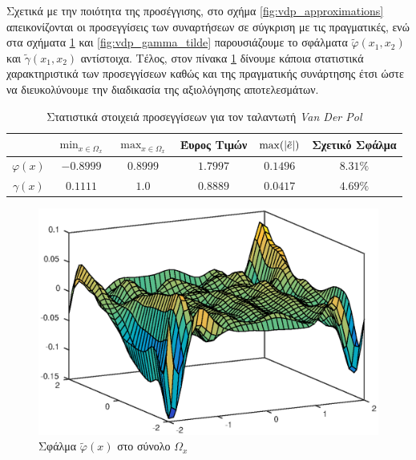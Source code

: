 {Σχετικά με την ποιότητα της προσέγγισης, στο σχήμα \ref{fig:vdp_approximations} απεικονίζονται οι προσεγγίσεις των συναρτήσεων σε σύγκριση με τις πραγματικές, ενώ στα σχήματα \ref{fig:vdp_phi_tilde} και \ref{fig:vdp_gamma_tilde} παρουσιάζουμε το σφάλματα $\tilde{\varphi}(x_1,x_2)$ και $\tilde{\gamma}(x_1,x_2)$ αντίστοιχα. Τέλος, στον πίνακα \ref{tab:statistics_vdp} δίνουμε κάποια στατιστικά χαρακτηριστικά των προσεγγίσεων καθώς και της πραγματικής συνάρτησης έτσι ώστε να διευκολύνουμε την διαδικασία της αξιολόγησης αποτελεσμάτων.

}

\begin{table}
	\centering
	\begin{tabular}{  c | c | c | c | c | c }
		& $\min_{x \in \Omega_x}$ & $\max_{x \in \Omega_x}$ & Έυρος Τιμών & $\max(\abs{\tilde{e}})$ & Σχετικό Σφάλμα  \\ \hline \hline
		$\varphi(x)$ & $-0.8999$ & $0.8999$ & $1.7997$ & $0.1496$ & $8.31\%$ \\
		$\gamma(x)$  & $ 0.1111$ & $ 1.0$   & $0.8889$ & $0.0417$ & $4.69\%$
	\end{tabular}
	\label{tab:statistics_vdp}
	\caption{Στατιστικά στοιχειά προσεγγίσεων για τον ταλαντωτή \textit{Van Der Pol}}
\end{table}

\begin{figure}
	\includegraphics{plots/experiments/vdp/phi_hat_error.eps}
	\caption{Σφάλμα $\tilde{\varphi}(x)$ στο σύνολο $\Omega_x$}
	\label{fig:vdp_phi_tilde}
\end{figure}

